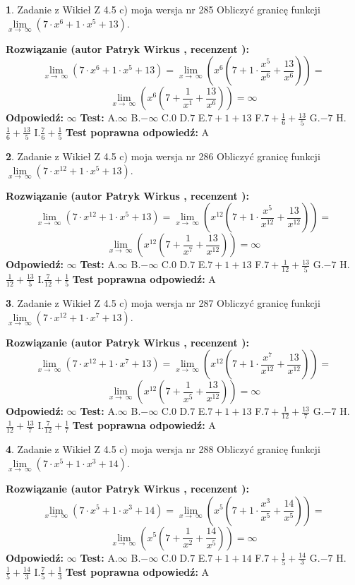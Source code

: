 \documentclass[12pt, a4paper]{article}
\theoremstyle{definition} %
\newtheorem{zad}{}
\newcommand{\zadStart}[1]{\begin{zad}#1\newline}
\newcommand{\zadStop}{\end{zad}}
\newcommand{\rozwStart}[2]{\noindent \textbf{Rozwiązanie (autor #1 , recenzent #2): }\newline}
\newcommand{\rozwStop}{\newline}
\newcommand{\odpStart}{\noindent \textbf{Odpowiedź:}\newline}
\newcommand{\odpStop}{\newline}
\newcommand{\testStart}{\noindent \textbf{Test:}\newline}
\newcommand{\testStop}{\newline}
\newcommand{\kluczStart}{\noindent \textbf{Test poprawna odpowiedź:}\newline}
\newcommand{\kluczStop}{\newline}
\begin{document}
\zadStart{Zadanie z Wikieł Z 4.5 c) moja wersja nr 285}
Obliczyć granicę funkcji  $\lim\limits_{x\to\ \infty}(7 \cdot x^{6}+1 \cdot x^{5}+13)$.
\zadStop
\rozwStart{Patryk Wirkus}{}
$$\lim\limits_{x\to\ \infty}(7 \cdot x^{6}+1 \cdot x^{5}+13) = \lim\limits_{x\to\ \infty}(x^{6}(7 +1 \cdot \frac{x^{5}}{x^{6}}+\frac{13}{x^{6}})) =$$ $$\lim\limits_{x\to\ \infty}(x^{6}(7 +\frac{1}{x^{1}}+\frac{13}{x^{6}})) =\infty$$
\rozwStop
\odpStart
$\infty$
\odpStop
\testStart
A.$\infty$ B.$-\infty$ C.$0$ D.$7$ E.$7 + 1 + 13$
F.$7+\frac{1}{6}+\frac{13}{5}$ G.$-7$
H.$\frac{1}{6}+\frac{13}{5}$
I.$\frac{7}{6}+\frac{1}{5}$
\testStop
\kluczStart
A
\kluczStop



\zadStart{Zadanie z Wikieł Z 4.5 c) moja wersja nr 286}
Obliczyć granicę funkcji  $\lim\limits_{x\to\ \infty}(7 \cdot x^{12}+1 \cdot x^{5}+13)$.
\zadStop
\rozwStart{Patryk Wirkus}{}
$$\lim\limits_{x\to\ \infty}(7 \cdot x^{12}+1 \cdot x^{5}+13) = \lim\limits_{x\to\ \infty}(x^{12}(7 +1 \cdot \frac{x^{5}}{x^{12}}+\frac{13}{x^{12}})) =$$ $$\lim\limits_{x\to\ \infty}(x^{12}(7 +\frac{1}{x^{7}}+\frac{13}{x^{12}})) =\infty$$
\rozwStop
\odpStart
$\infty$
\odpStop
\testStart
A.$\infty$ B.$-\infty$ C.$0$ D.$7$ E.$7 + 1 + 13$
F.$7+\frac{1}{12}+\frac{13}{5}$ G.$-7$
H.$\frac{1}{12}+\frac{13}{5}$
I.$\frac{7}{12}+\frac{1}{5}$
\testStop
\kluczStart
A
\kluczStop



\zadStart{Zadanie z Wikieł Z 4.5 c) moja wersja nr 287}
Obliczyć granicę funkcji  $\lim\limits_{x\to\ \infty}(7 \cdot x^{12}+1 \cdot x^{7}+13)$.
\zadStop
\rozwStart{Patryk Wirkus}{}
$$\lim\limits_{x\to\ \infty}(7 \cdot x^{12}+1 \cdot x^{7}+13) = \lim\limits_{x\to\ \infty}(x^{12}(7 +1 \cdot \frac{x^{7}}{x^{12}}+\frac{13}{x^{12}})) =$$ $$\lim\limits_{x\to\ \infty}(x^{12}(7 +\frac{1}{x^{5}}+\frac{13}{x^{12}})) =\infty$$
\rozwStop
\odpStart
$\infty$
\odpStop
\testStart
A.$\infty$ B.$-\infty$ C.$0$ D.$7$ E.$7 + 1 + 13$
F.$7+\frac{1}{12}+\frac{13}{7}$ G.$-7$
H.$\frac{1}{12}+\frac{13}{7}$
I.$\frac{7}{12}+\frac{1}{7}$
\testStop
\kluczStart
A
\kluczStop



\zadStart{Zadanie z Wikieł Z 4.5 c) moja wersja nr 288}
Obliczyć granicę funkcji  $\lim\limits_{x\to\ \infty}(7 \cdot x^{5}+1 \cdot x^{3}+14)$.
\zadStop
\rozwStart{Patryk Wirkus}{}
$$\lim\limits_{x\to\ \infty}(7 \cdot x^{5}+1 \cdot x^{3}+14) = \lim\limits_{x\to\ \infty}(x^{5}(7 +1 \cdot \frac{x^{3}}{x^{5}}+\frac{14}{x^{5}})) =$$ $$\lim\limits_{x\to\ \infty}(x^{5}(7 +\frac{1}{x^{2}}+\frac{14}{x^{5}})) =\infty$$
\rozwStop
\odpStart
$\infty$
\odpStop
\testStart
A.$\infty$ B.$-\infty$ C.$0$ D.$7$ E.$7 + 1 + 14$
F.$7+\frac{1}{5}+\frac{14}{3}$ G.$-7$
H.$\frac{1}{5}+\frac{14}{3}$
I.$\frac{7}{5}+\frac{1}{3}$
\testStop
\kluczStart
A
\kluczStop
\end{document}
